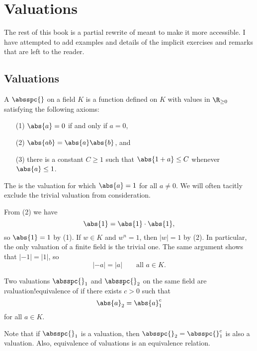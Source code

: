 \chapter{Valuations}
The rest of this book is a partial rewrite of \cite{cassels:global}
meant to make it more accessible.  I have attempted to add examples
and details of the implicit exercises and remarks that are left to the
reader.

\section{Valuations}

\begin{definition}[Valuation]
A  $\absspc{}$ on a field $K$ is a function
defined on $K$ with values in $\R_{\geq 0}$ satisfying
the following axioms:
\begin{enumerate}
\item[(1)] $\abs{a} = 0$ if and only if $a = 0$,
\item[(2)] $\abs{ab}=\abs{a}\abs{b}$, and
\item[(3)] there is a constant $C\geq 1$ such that 
$\abs{1+a}\leq C$ whenever $\abs{a}\leq 1$.
\end{enumerate}
\end{definition}

The  is the valuation for which
$\abs{a}=1$ for all $a\neq 0$.  We will often tacitly
exclude the trivial valuation from consideration.

From (2) we have 
$$
  \abs{1} = \abs{1}\cdot \abs{1},
$$
so $\abs{1} = 1$ by (1).
If $w\in K$ and $w^n=1$, then $|w|=1$ by (2).
In particular, the only valuation of a finite field
is the trivial one.    The same argument shows that $|-1|=|1|$,
so 
$$
  |-a| = |a|\qquad \text{all }a \in K.
$$

\begin{definition}[Equivalent]
Two valuations $\absspc{}_1$ and $\absspc{}_2$ on the
same field are \i{valuation!equivalence of} 
if there exists $c>0$ such
that $$\abs{a}_2 = \abs{a}_1^c$$
for all $a\in K$.
\end{definition}
Note that if $\absspc{}_1$ is a valuation, then 
$\absspc{}_2=\absspc{}_1^c$ is also a valuation.
Also, equivalence of valuations is an equivalence relation.

